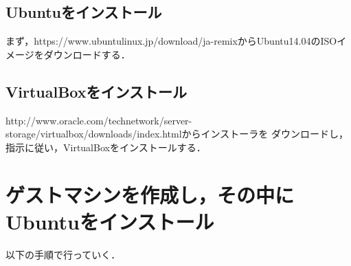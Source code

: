 \subsection{Ubuntuをインストール}
まず，https://www.ubuntulinux.jp/download/ja-remixからUbuntu14.04のISOイメージをダウンロードする．

\subsection{VirtualBoxをインストール}
http://www.oracle.com/technetwork/server-storage/virtualbox/downloads/index.htmlからインストーラを
ダウンロードし，指示に従い，VirtualBoxをインストールする．



\section{ゲストマシンを作成し，その中にUbuntuをインストール}
以下の手順で行っていく．

